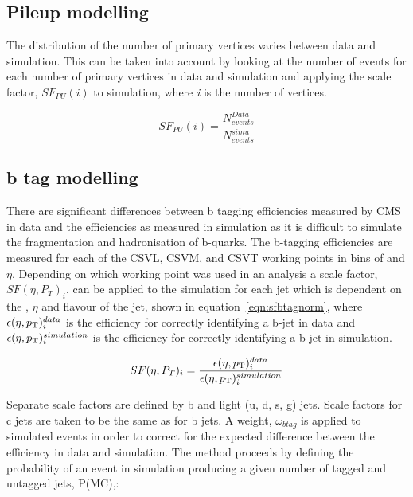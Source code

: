 \subsection{Pileup modelling}
\label{sec:pile-up}
The distribution of the number of primary vertices varies between data and simulation. This can be taken into account by looking at the number of events for each number of primary vertices in data and simulation and applying the scale factor, $SF_{PU}\left( i \right)$ to simulation, where \emph{i} is the number of vertices.

\begin{equation}
SF_{PU}\left( i \right) = \frac{N_{events}^{Data}}{  N_{events}^{simu}} 
\label{eqn:PUSF}
\end{equation}

\subsection{b tag modelling}

There are significant differences between b tagging efficiencies measured by CMS in data and the efficiencies as measured in simulation as it is difficult to simulate the fragmentation and hadronisation of b-quarks. 
The b-tagging efficiencies are measured for each of the CSVL, CSVM, and CSVT working points in bins of \pt and $\eta$. Depending on which working point was used in an analysis a scale factor, $SF(\eta, P_{T})_{i}$,  can be applied to the simulation for each jet which is dependent on the \pt, $\eta$ and flavour of the jet, shown in equation~\ref{eqn:sfbtagnorm}, where $\epsilon(\eta , p_{\mathrm{T}})^{data}_{i}$ is the efficiency for correctly identifying a b-jet in data and $\epsilon(\eta , p_{\mathrm{T}})^{simulation}_{i}$ is the efficiency for correctly identifying a b-jet in simulation.

\begin{centering}
\begin{equation}
SF(\eta, P_{T})_{i} = \frac{\epsilon(\eta , p_{\mathrm{T}})^{data}_{i}}{\epsilon(\eta , p_{\mathrm{T}})^{simulation}_{i}}
\label{eqn:sfbtagnorm}
\end{equation}
\end{centering}
Separate scale factors are defined by b and light (u, d, s, g) jets. Scale factors for c jets are taken to be the same as for b jets. A weight, $\omega_{btag}$ is applied to simulated events in order to correct for the expected difference between the efficiency in data and simulation. The method proceeds by defining the probability of an event in simulation producing a given number of tagged and untagged jets, P(MC),:

